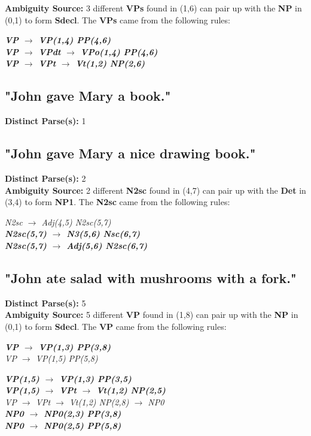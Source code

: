 \documentclass{article}
\begin{document}
\textbf{Ambiguity Source:} 3 different \textbf{VPs} found in (1,6) can pair up with the \textbf{NP} in (0,1) to form \textbf{Sdecl}. The \textbf{VPs} came from the following rules:

\begin{center}
	\textbf{\emph{VP $\rightarrow$ VP(1,4) PP(4,6)}\\
	\emph{VP $\rightarrow$ VPdt $\rightarrow$ VPo(1,4) PP(4,6)}\\
	\emph{VP $\rightarrow$ VPt $\rightarrow$ Vt(1,2) NP(2,6)}}
\end{center}

\subsection{"John gave Mary a book."}

\textbf{Distinct Parse(s):} 1

\subsection{"John gave Mary a nice drawing book."}

\textbf{Distinct Parse(s):} 2\\

\textbf{Ambiguity Source:} 2 different \textbf{N2sc} found in (4,7) can pair up with the \textbf{Det} in (3,4) to form \textbf{NP1}. The \textbf{N2sc} came from the following rules:

\begin{center}
\emph{N2sc $\rightarrow$ Adj(4,5) N2sc(5,7)}\\
\textbf{\emph{N2sc(5,7) $\rightarrow$ N3(5,6) Nsc(6,7)}\\
\emph{N2sc(5,7) $\rightarrow$ Adj(5,6) N2sc(6,7)}}
\end{center}

\subsection{"John ate salad with mushrooms with a fork."}

\textbf{Distinct Parse(s):} 5\\

\textbf{Ambiguity Source:} 5 different \textbf{VP} found in (1,8) can pair up with the \textbf{NP} in (0,1) to form \textbf{Sdecl}. The \textbf{VP} came from the following rules:

\begin{center}
	\textbf{\emph{VP $\rightarrow$ VP(1,3) PP(3,8)}}\\
	
	\emph{VP $\rightarrow$ VP(1,5) PP(5,8)}
	
	\textbf{\emph{VP(1,5) $\rightarrow$ VP(1,3) PP(3,5)}\\
	\emph{VP(1,5) $\rightarrow$ VPt $\rightarrow$ Vt(1,2) NP(2,5)}}\\

	\emph{VP $\rightarrow$ VPt $\rightarrow$ Vt(1,2) NP(2,8) $\rightarrow$ NP0}\\
	\textbf{\emph{NP0 $\rightarrow$ NP0(2,3) PP(3,8)}\\
	\emph{NP0 $\rightarrow$ NP0(2,5) PP(5,8)}}
\end{center}
\end{document}

